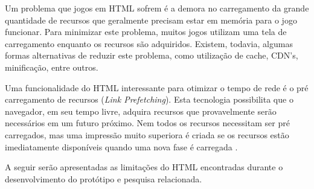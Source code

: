 Um problema que jogos em HTML sofrem é a demora no carregamento
da grande quantidade de recursos que geralmente precisam estar em
memória para o jogo funcionar. Para minimizar este problema, muitos
jogos utilizam uma tela de carregamento enquanto os recursos são
adquiridos. Existem, todavia, algumas formas alternativas de reduzir 
este problema, como utilização de cache, CDN's, minificação, entre
outros.

Uma funcionalidade do HTML interessante para otimizar o tempo de
rede é o pré carregamento de recursos (\textit{Link Prefetching}).
Esta tecnologia possibilita que o navegador, em seu tempo livre,
adquira recursos que provavelmente serão necessários em um futuro
próximo. Nem todos os recursos necessitam ser pré carregados,
mas uma impressão muito superiora é criada se os recursos estão
imediatamente disponíveis quando uma nova fase é carregada
\textsc{\autocite[p. 39]{creatingFun}}.

A seguir serão apresentadas as limitações do HTML encontradas durante
o desenvolvimento do protótipo e pesquisa relacionada.

